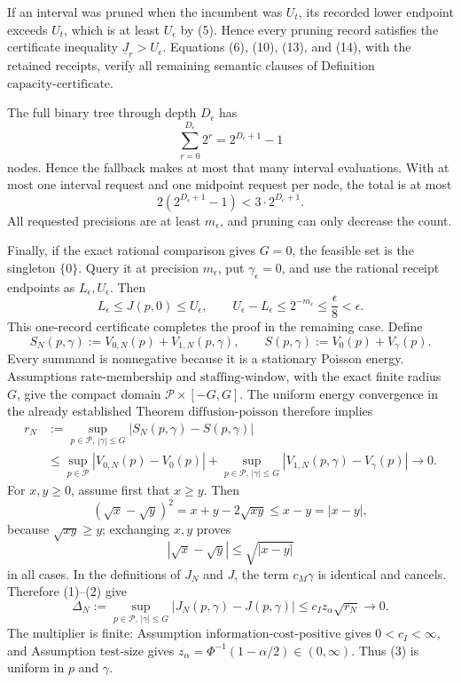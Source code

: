 If an interval was pruned when the incumbent was \(U_t\), its recorded lower endpoint exceeds \(U_t\), which is at least \(U_\epsilon\) by (5).  Hence every pruning record satisfies the certificate inequality \(\underline J_r>U_\epsilon\).  Equations (6), (10), (13), and (14), with the retained receipts, verify all remaining semantic clauses of Definition \(\mathrm{capacity\mbox{-}certificate}\).

The full binary tree through depth \(D_\epsilon\) has
\[
 \sum_{r=0}^{D_\epsilon}2^r=2^{D_\epsilon+1}-1
\tag{15}
\]
nodes.  Hence the fallback makes at most that many interval evaluations.  With at most one interval request and one midpoint request per node, the total is at most
\[
 2(2^{D_\epsilon+1}-1)<3\cdot2^{D_\epsilon+1}.
\tag{16}
\]
All requested precisions are at least \(m_\epsilon\), and pruning can only decrease the count.

Finally, if the exact rational comparison gives \(G=0\), the feasible set is the singleton \(\{0\}\).  Query it at precision \(m_\epsilon\), put \(\gamma_\epsilon=0\), and use the rational receipt endpoints as \(L_\epsilon,U_\epsilon\).  Then
\[
 L_\epsilon\leq J(p,0)\leq U_\epsilon,
 \qquad U_\epsilon-L_\epsilon\leq2^{-m_\epsilon}
 \leq\frac\epsilon8<\epsilon.
\]
This one-record certificate completes the proof in the remaining case.
Define
\[
 S_N(p,\gamma):=V_{0,N}(p)+V_{1,N}(p,\gamma),
 \qquad S(p,\gamma):=V_0(p)+V_\gamma(p).
\]
Every summand is nonnegative because it is a stationary Poisson energy.  Assumptions \(\mathrm{rate\mbox{-}membership}\) and \(\mathrm{staffing\mbox{-}window}\), with the exact finite radius \(G\), give the compact domain \(\mathcal P\times[-G,G]\).  The uniform energy convergence in the already established Theorem \(\mathrm{diffusion\mbox{-}poisson}\) therefore implies
\[
 \begin{aligned}
 r_N&:=\sup_{p\in\mathcal P,\,|\gamma|\leq G}
 |S_N(p,\gamma)-S(p,\gamma)|\\
 &\leq\sup_{p\in\mathcal P}|V_{0,N}(p)-V_0(p)|
 +\sup_{p\in\mathcal P,\,|\gamma|\leq G}
 |V_{1,N}(p,\gamma)-V_\gamma(p)|
 \longrightarrow0.
 \end{aligned}
\tag{1}
\]
For \(x,y\geq0\), assume first that \(x\geq y\).  Then
\[
 (\sqrt x-\sqrt y)^2=x+y-2\sqrt{xy}\leq x-y=|x-y|,
\]
because \(\sqrt{xy}\geq y\); exchanging \(x,y\) proves
\[
 |\sqrt x-\sqrt y|\leq\sqrt{|x-y|}
\tag{2}
\]
in all cases.  In the definitions of \(J_N\) and \(J\), the term \(c_M\gamma\) is identical and cancels.  Therefore (1)--(2) give
\[
 \Delta_N:=\sup_{p\in\mathcal P,\,|\gamma|\leq G}
 |J_N(p,\gamma)-J(p,\gamma)|
 \leq c_Iz_\alpha\sqrt{r_N}\longrightarrow0.
\tag{3}
\]
The multiplier is finite: Assumption \(\mathrm{information\mbox{-}cost\mbox{-}positive}\) gives \(0<c_I<\infty\), and Assumption \(\mathrm{test\mbox{-}size}\) gives \(z_\alpha=\Phi^{-1}(1-\alpha/2)\in(0,\infty)\).  Thus (3) is uniform in \(p\) and \(\gamma\).


